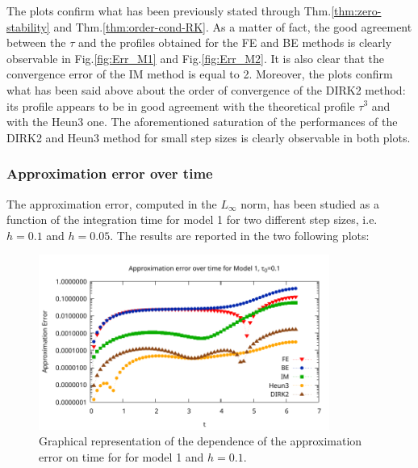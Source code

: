 \documentclass[11pt]{article}
\theoremstyle{theorem}
\theoremstyle{definition}
\begin{document}
The plots confirm what has been previously stated through Thm.\ref{thm:zero-stability} and Thm.\ref{thm:order-cond-RK}. As a matter of fact, the good agreement between the $\tau$ and the profiles obtained for the FE and BE methods is clearly observable in Fig.\ref{fig:Err_M1} and Fig.\ref{fig:Err_M2}. It is also clear that the convergence error of the IM method is equal to 2. Moreover, the plots confirm what has been said above about the order of convergence of the DIRK2 method: its profile appears to be in good agreement with the theoretical profile $\tau^3$ and with the Heun3 one. The aforementioned saturation of the performances of the DIRK2 and Heun3 method for small step sizes is clearly observable in both plots.\\

\subsubsection{Approximation error over time}
The approximation error, computed in the $L_\infty$ norm, has been studied as a function of the integration time for model 1 for two different step sizes, i.e. $h=0.1$ and $h=0.05$. The results are reported in the two following plots:

\begin{figure}[H]
	\begin{center}
		\includegraphics[width=0.85\textwidth]{Err_vs_t_1}
	\end{center}
	\caption{Graphical representation of the dependence of the approximation error on time for for model 1 and $h=0.1$.
		\label{fig:Err_vs_t_0_1}}
\end{figure}
\end{document}
